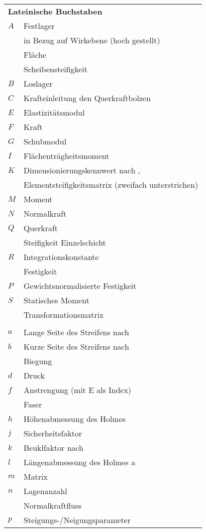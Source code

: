 \begin{longtable}[l]{ll}
	\multicolumn{2}{l}{\textbf{Lateinische Buchstaben}}\\
	$ A $&Festlager\\
	&in Bezug auf Wirkebene (hoch gestellt)\\
	&Fläche\\
	&Scheibensteifigkeit\\
	$ B $&Loslager\\
	$ C $&Krafteinleitung den Querkraftbolzen\\
	$ E $&Elastizitätsmodul \\
	$ F $&Kraft \\
	$ G $&Schubmodul\\
	$ I $&Flächenträgheitsmoment \\
	$ K $&Dimensionierungskennwert nach \cite{item5},\\
	&Elementsteifigkeitsmatrix (zweifach unterstrichen)\\
	$M$&Moment\\
	$N$& Normalkraft\\
	$ Q $&Querkraft\\
	&Steifigkeit Einzelschicht\\
	$ R $&Integrationskonstante \\
	&Festigkeit\\
	$ P $&Gewichtsnormalisierte Festigkeit\\
	$ S $&Statisches Moment\\
	&Transformationsmatrix\\
	& \\
	$ a $&Lange Seite des Streifens nach \cite{item1}\\
	$ b $&Kurze Seite des Streifens nach \cite{item1}\\
	&Biegung\\
	$ d$& Druck\\
	$ f $&Anstrengung (mit E als Index)\\
	&Faser\\
	$ h $&Höhenabmessung des Holmes \\
	$ j $&Sicherheitsfaktor\\
	$k$&Beuklfaktor nach \cite{item1}\\
	$ l $&Längenabmessung des Holmes a\\
	$m$&Matrix\\
	$ n $&Lagenanzahl\\
	&Normalkraftfluss\\
	$ p $&Steigungs-/Neigungsparameter\\

\end{longtable}

